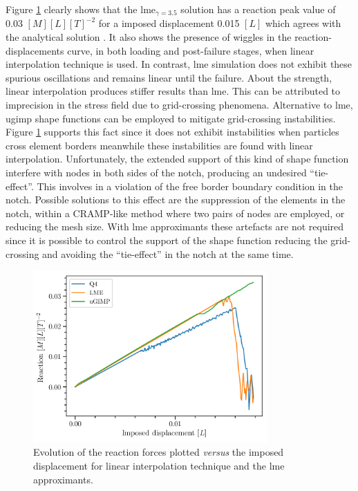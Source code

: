 \documentclass[preprint,12pt,a4paper]{elsarticle}
\begin{document}
Figure \ref{fig:Reactions-cracked-panel-mode-I} clearly shows that the
\acrshort{lme}$_{\gamma = 3.5}$ solution has a reaction peak value of 0.03 $[M] [L]
[T]^{-2}$ for a imposed displacement 0.015 $[L]$ which agrees with the
analytical solution \cite{Pandolfi_2012}. It also shows the presence
of wiggles in the reaction-displacements curve, in both loading and
post-failure stages, when linear interpolation technique is used. In
contrast, \acrshort{lme} simulation does not exhibit these spurious
oscillations and remains linear until the failure. About the strength,
linear interpolation produces stiffer results than \acrshort{lme}. This can be attributed to imprecision in the
stress field due to grid-crossing phenomena. Alternative to
  \acrshort{lme}, \acrshort{ugimp} shape
functions can be employed to mitigate grid-crossing instabilities.
Figure \ref{fig:Reactions-cracked-panel-mode-I} supports this fact since it
does not exhibit instabilities when particles cross element borders meanwhile these instabilities are found with linear interpolation. Unfortunately, the extended support of this
kind of shape function interfere with nodes in both sides of the notch,
producing an undesired ``tie-effect''. This involves in a violation of
the free border boundary condition in the notch. Possible solutions to this effect
are the suppression of the elements in the notch, within a CRAMP-like
method where two pairs of nodes are employed, or reducing the mesh size. With \acrshort{lme}
approximants these artefacts are not required since it is possible to control the support
of the shape function reducing the grid-crossing and avoiding the
``tie-effect'' in the notch at the same time.\\
\begin{figure}
  \centering
  \includegraphics[width=0.8\textwidth]{Figure-Reactions-Mode-I}
  \caption{Evolution of the reaction forces plotted \textit{versus}
    the imposed displacement for linear interpolation technique and
    the \acrshort{lme} approximants.}
  \label{fig:Reactions-cracked-panel-mode-I}
\end{figure}
\end{document}
